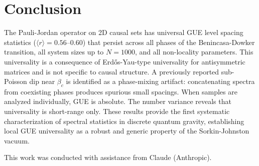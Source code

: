 \documentclass[aps,prd,twocolumn,superscriptaddress,nofootinbib]{revtex4-2}
\begin{document}
\section{Conclusion}

The Pauli-Jordan operator on 2D causal sets has universal GUE level spacing statistics ($\langle r \rangle = 0.56$--$0.60$) that persist across all phases of the Benincasa-Dowker transition, all system sizes up to $N = 1000$, and all non-locality parameters. This universality is a consequence of Erd\H{o}s-Yau-type universality for antisymmetric matrices and is not specific to causal structure. A previously reported sub-Poisson dip near $\beta_c$ is identified as a phase-mixing artifact: concatenating spectra from coexisting phases produces spurious small spacings. When samples are analyzed individually, GUE is absolute. The number variance reveals that universality is short-range only. These results provide the first systematic characterization of spectral statistics in discrete quantum gravity, establishing local GUE universality as a robust and generic property of the Sorkin-Johnston vacuum.

\begin{acknowledgments}
This work was conducted with assistance from Claude (Anthropic).
\end{acknowledgments}
\end{document}
